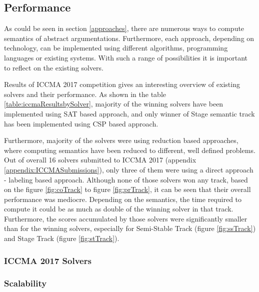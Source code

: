 \subsection{Performance}
As could be seen in section \ref{approaches}, there are numerous ways to compute semantics of abstract argumentations. Furthermore, each approach, depending on technology, can be implemented using different algorithms, programming languages or existing systems. With such a range of possibilities it is important to reflect on the existing solvers.

Results of ICCMA 2017 competition \citep{iccmaResults} gives an interesting overview of existing solvers and their performance. As shown in the table \ref{table:iccmaResultsbySolver}, majority of the winning solvers have been implemented using SAT based approach, and only winner of Stage semantic track has been implemented using CSP based approach. 

Furthermore, majority of the solvers were using reduction based approaches, where computing semantics have been reduced to different, well defined problems. Out of overall 16 solvers submitted to ICCMA 2017 (appendix \ref{appendix:ICCMASubmissions}), only three of them were using a direct approach - labeling based approach. Although none of those solvers won any track, based on the figure \ref{fig:coTrack} to figure \ref{fig:prTrack}, it can be seen that their overall performance was mediocre. Depending on the semantics, the time required to compute it could be as much as double of the winning solver in that track. Furthermore, the scores accumulated by those solvers were significantly smaller than for the winning solvers, especially for Semi-Stable Track (figure \ref{fig:ssTrack}) and Stage Track (figure \ref{fig:stTrack}).

\subsubsection{ICCMA 2017 Solvers}

\subsubsection{Scalability}
